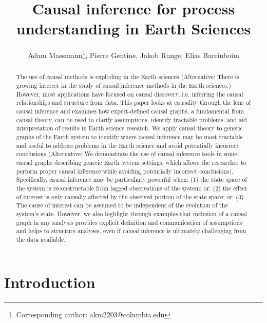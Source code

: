 \documentclass[12pt]{article}
\begin{document}
\title{Causal inference for process understanding in Earth Sciences}

\author{Adam Massmann\thanks{Corresponding author:
    akm2203@columbia.edu}, Pierre Gentine, Jakob Runge, Elias Bareinboim}

\maketitle
\begin{abstract}
  The use of causal methods is exploding in the Earth sciences
  (Alternative: There is growing interest in the study of causal
  inference methods in the Earth sciences.) However, most applications
  have focused on causal discovery, i.e. inferring the causal
  relationships and structure from data. This paper looks at causality
  through the lens of causal inference and examines how expert-defined
  causal graphs, a fundamental from causal theory, can be used to
  clarify assumptions, identify tractable problems, and aid
  interpretation of results in Earth science research. We apply causal
  theory to generic graphs of the Earth system to identify where
  causal inference may be most tractable and useful to address
  problems in the Earth science and avoid potentially incorrect
  conclusions (Alternative: We demonstrate the use of causal inference
  tools in some causal graphs describing generic Earth system
  settings, which allows the researcher to perform proper causal
  inference while avoiding potentially incorrect
  conclusions). Specifically, causal inference may be particularly
  powerful when: (1) the state space of the system is reconstructable
  from lagged observations of the system; or: (2) the effect of
  interest is only causally affected by the observed portion of the
  state space; or: (3) The cause of interest can be assumed to be
  independent of the evolution of the system’s state. However, we also
  highlight through examples that inclusion of a causal graph in any
  analysis provides explicit definition and communication of
  assumptions and helps to structure analyses, even if causal
  inference is ultimately challenging from the data available.
\end{abstract}

\section{Introduction}
\end{document}
